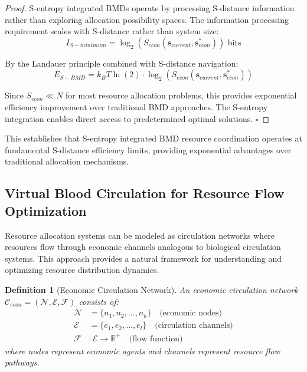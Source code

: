 \documentclass[12pt,a4paper]{article}
\newtheorem{definition}[theorem]{Definition}
\begin{document}
\begin{proof}
S-entropy integrated BMDs operate by processing S-distance information rather than exploring allocation possibility spaces. The information processing requirement scales with S-distance rather than system size:
\begin{equation}
I_{S-minimum} = \log_2(S_{econ}(\mathbf{s}_{current}, \mathbf{s}^*_{econ})) \text{ bits}
\end{equation}

By the Landauer principle combined with S-distance navigation:
\begin{equation}
E_{S-BMD} = k_B T \ln(2) \cdot \log_2(S_{econ}(\mathbf{s}_{current}, \mathbf{s}^*_{econ}))
\end{equation}

Since $S_{econ} \ll N$ for most resource allocation problems, this provides exponential efficiency improvement over traditional BMD approaches. The S-entropy integration enables direct access to predetermined optimal solutions. $\square$
\end{proof}

This establishes that S-entropy integrated BMD resource coordination operates at fundamental S-distance efficiency limits, providing exponential advantages over traditional allocation mechanisms.

\subsection{Virtual Blood Circulation for Resource Flow Optimization}

Resource allocation systems can be modeled as circulation networks where resources flow through economic channels analogous to biological circulation systems. This approach provides a natural framework for understanding and optimizing resource distribution dynamics.

\begin{definition}[Economic Circulation Network]
An economic circulation network $\mathcal{C}_{econ} = (\mathcal{N}, \mathcal{E}, \mathcal{F})$ consists of:
\begin{align}
\mathcal{N} &= \{n_1, n_2, \ldots, n_k\} \quad \text{(economic nodes)} \\
\mathcal{E} &= \{e_1, e_2, \ldots, e_l\} \quad \text{(circulation channels)} \\
\mathcal{F} &: \mathcal{E} \rightarrow \mathbb{R}^+ \quad \text{(flow function)}
\end{align}
where nodes represent economic agents and channels represent resource flow pathways.
\end{definition}
\end{document}
